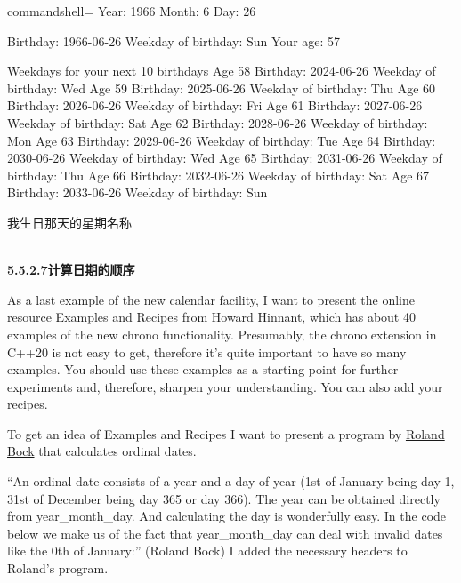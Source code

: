 \begin{tcblisting}{commandshell={}}
Year: 1966
Month: 6
Day: 26

Birthday: 1966-06-26
Weekday of birthday: Sun
Your age: 57

Weekdays for your next 10 birthdays
  Age 58
    Birthday: 2024-06-26
    Weekday of birthday: Wed
  Age 59
    Birthday: 2025-06-26
    Weekday of birthday: Thu
  Age 60
    Birthday: 2026-06-26
    Weekday of birthday: Fri
  Age 61
    Birthday: 2027-06-26
    Weekday of birthday: Sat
  Age 62
    Birthday: 2028-06-26
    Weekday of birthday: Mon
  Age 63
    Birthday: 2029-06-26
    Weekday of birthday: Tue
  Age 64
    Birthday: 2030-06-26
    Weekday of birthday: Wed
  Age 65
    Birthday: 2031-06-26
    Weekday of birthday: Thu
  Age 66
    Birthday: 2032-06-26
    Weekday of birthday: Sat
  Age 67
    Birthday: 2033-06-26
    Weekday of birthday: Sun
\end{tcblisting}

\begin{center}
我生日那天的星期名称
\end{center}

\hspace*{\fill} \\ %
\noindent
\textbf{5.5.2.7\hspace{0.2cm}计算日期的顺序}

As a last example of the new calendar facility, I want to present the online resource \href{https://github.com/HowardHinnant/date/wiki/Examples-and-Recipes}{Examples and Recipes} from Howard Hinnant, which has about 40 examples of the new chrono functionality. Presumably, the chrono extension in C++20 is not easy to get, therefore it’s quite important to have so many examples. You should use these examples as a starting point for further experiments and, therefore, sharpen your understanding. You can also add your recipes.

To get an idea of Examples and Recipes I want to present a program by \href{https://github.com/rbock}{Roland Bock} that calculates ordinal dates.

“An ordinal date consists of a year and a day of year (1st of January being day 1, 31st of December being day 365 or day 366). The year can be obtained directly from year\_month\_day. And calculating the day is wonderfully easy. In the code below we make us of the fact that year\_month\_day can deal with invalid dates like the 0th of January:” (Roland Bock) I added the necessary headers to Roland’s program.

